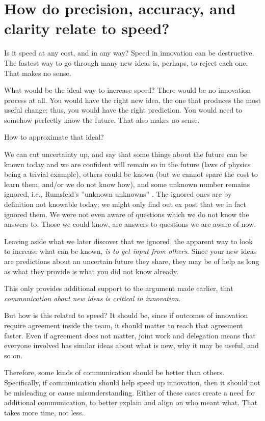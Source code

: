 \section{How do precision, accuracy, and clarity relate to speed?}
\label{c2:s5}
Is it speed at any cost, and in any way? Speed in innovation can be destructive. The fastest way to go through many new ideas is, perhaps, to reject each one.\cite{dougherty2008interpretive,dyer2009innovators,martins2003building} That makes no sense.

What would be the ideal way to increase speed? There would be no innovation process at all. You would have the right new idea, the one that produces the most useful change; thus, you would have the right prediction. You would need to somehow perfectly know the future. That also makes no sense. 

How to approximate that ideal? 

We can cut uncertainty up, and say that some things about the future can be known today and we are confident will remain so in the future (laws of physics being a trivial example), others could be known (but we cannot spare the cost to learn them, and/or we do not know how), and some unknown number remains ignored, i.e., Rumsfeld's ''unknown unknowns'' \cite{wikipedia-known-knowns}. The ignored ones are by definition not knowable today; we might only find out ex post that we in fact ignored them. We were not even aware of questions which we do not know the answers to. Those we could know, are answers to questions we are aware of now.

Leaving aside what we later discover that we ignored, the apparent way to look to increase what can be known, \textit{is to get input from others}. Since your new ideas are predictions about an uncertain future they share, they may be of help as long as what they provide is what you did not know already.

This only provides additional support to the argument made earlier, that \textit{communication about new ideas is critical in innovation}.

But how is this related to speed? It should be, since if outcomes of innovation require agreement inside the team, it should matter to reach that agreement faster. Even if agreement does not matter, joint work and delegation means that everyone involved has similar ideas about what is new, why it may be useful, and so on.

Therefore, some kinds of communication should be better than others. Specifically, if communication should help speed up innovation, then it should not be misleading or cause misunderstanding. Either of these cases create a need for additional communication, to better explain and align on who meant what. That takes more time, not less.

